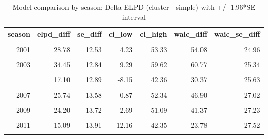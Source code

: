 \begin{table}[!h]
\centering
\caption{Model comparison by season: Delta ELPD (cluster - simple) with +/- 1.96*SE interval}
\centering
\begin{tabular}[t]{rrrrrrr}
\toprule
season & elpd\_diff & se\_diff & ci\_low & ci\_high & waic\_diff & waic\_se\_diff\\
\midrule
\cellcolor{gray!10}{2000} & \cellcolor{gray!10}{35.49} & \cellcolor{gray!10}{12.13} & \cellcolor{gray!10}{11.70} & \cellcolor{gray!10}{59.27} & \cellcolor{gray!10}{66.56} & \cellcolor{gray!10}{24.17}\\
2001 & 28.78 & 12.53 & 4.23 & 53.33 & 54.08 & 24.96\\
\cellcolor{gray!10}{2002} & \cellcolor{gray!10}{27.75} & \cellcolor{gray!10}{12.29} & \cellcolor{gray!10}{3.65} & \cellcolor{gray!10}{51.84} & \cellcolor{gray!10}{51.42} & \cellcolor{gray!10}{24.42}\\
2003 & 34.45 & 12.84 & 9.29 & 59.62 & 60.77 & 25.34\\
\cellcolor{gray!10}{2004} & \cellcolor{gray!10}{24.49} & \cellcolor{gray!10}{11.37} & \cellcolor{gray!10}{2.20} & \cellcolor{gray!10}{46.77} & \cellcolor{gray!10}{44.88} & \cellcolor{gray!10}{22.65}\\
\addlinespace
2005 & 17.10 & 12.89 & -8.15 & 42.36 & 30.37 & 25.63\\
\cellcolor{gray!10}{2006} & \cellcolor{gray!10}{22.82} & \cellcolor{gray!10}{13.24} & \cellcolor{gray!10}{-3.12} & \cellcolor{gray!10}{48.76} & \cellcolor{gray!10}{34.52} & \cellcolor{gray!10}{26.12}\\
2007 & 25.74 & 13.58 & -0.87 & 52.34 & 46.90 & 27.02\\
\cellcolor{gray!10}{2008} & \cellcolor{gray!10}{21.79} & \cellcolor{gray!10}{12.91} & \cellcolor{gray!10}{-3.51} & \cellcolor{gray!10}{47.09} & \cellcolor{gray!10}{37.79} & \cellcolor{gray!10}{25.63}\\
2009 & 24.20 & 13.72 & -2.69 & 51.09 & 41.37 & 27.23\\
\addlinespace
\cellcolor{gray!10}{2010} & \cellcolor{gray!10}{14.42} & \cellcolor{gray!10}{12.82} & \cellcolor{gray!10}{-10.72} & \cellcolor{gray!10}{39.55} & \cellcolor{gray!10}{22.04} & \cellcolor{gray!10}{25.35}\\
2011 & 15.09 & 13.91 & -12.16 & 42.35 & 23.78 & 27.52\\
\cellcolor{gray!10}{2012} & \cellcolor{gray!10}{12.43} & \cellcolor{gray!10}{14.62} & \cellcolor{gray!10}{-16.23} & \cellcolor{gray!10}{41.09} & \cellcolor{gray!10}{16.97} & \cellcolor{gray!10}{28.84}\\

\end{tabular}
\end{table}
